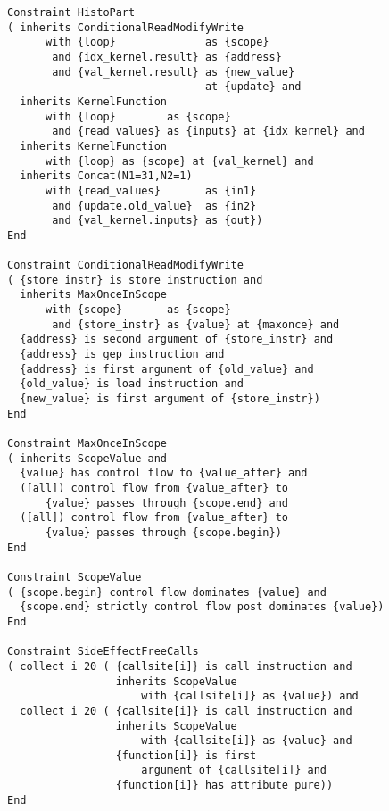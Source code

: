 \begin{figure}[p]
\begin{lstlisting}[language=IDL,basicstyle=\linespread{0.8}\ttfamily,
                   firstnumber=85]
Constraint HistoPart
( inherits ConditionalReadModifyWrite
      with {loop}              as {scope}
       and {idx_kernel.result} as {address}
       and {val_kernel.result} as {new_value}
                               at {update} and
  inherits KernelFunction
      with {loop}        as {scope}
       and {read_values} as {inputs} at {idx_kernel} and
  inherits KernelFunction
      with {loop} as {scope} at {val_kernel} and
  inherits Concat(N1=31,N2=1)
      with {read_values}       as {in1}
       and {update.old_value}  as {in2}
       and {val_kernel.inputs} as {out})
End

Constraint ConditionalReadModifyWrite
( {store_instr} is store instruction and
  inherits MaxOnceInScope
      with {scope}       as {scope}
       and {store_instr} as {value} at {maxonce} and
  {address} is second argument of {store_instr} and
  {address} is gep instruction and
  {address} is first argument of {old_value} and
  {old_value} is load instruction and
  {new_value} is first argument of {store_instr})
End

Constraint MaxOnceInScope
( inherits ScopeValue and
  {value} has control flow to {value_after} and
  ([all]) control flow from {value_after} to
      {value} passes through {scope.end} and
  ([all]) control flow from {value_after} to
      {value} passes through {scope.begin})
End

Constraint ScopeValue
( {scope.begin} control flow dominates {value} and
  {scope.end} strictly control flow post dominates {value})
End

Constraint SideEffectFreeCalls
( collect i 20 ( {callsite[i]} is call instruction and
                 inherits ScopeValue
                     with {callsite[i]} as {value}) and
  collect i 20 ( {callsite[i]} is call instruction and
                 inherits ScopeValue
                     with {callsite[i]} as {value} and
                 {function[i]} is first
                     argument of {callsite[i]} and
                 {function[i]} has attribute pure))
End
\end{lstlisting}
\end{figure}
